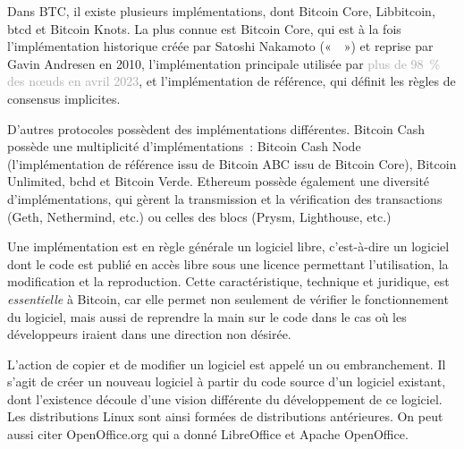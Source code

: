Dans BTC, il existe plusieurs implémentations, dont Bitcoin Core, Libbitcoin, btcd et Bitcoin Knots. La plus connue est Bitcoin Core, qui est à la fois l'implémentation historique créée par Satoshi Nakamoto («~~») et reprise par Gavin Andresen en 2010, l'implémentation principale utilisée par \textcolor{darkgray}{plus de 98~\% des nœuds en avril 2023}, et l'implémentation de référence, qui définit les règles de consensus implicites.

D'autres protocoles possèdent des implémentations différentes. Bitcoin Cash possède une multiplicité d'implémentations~: Bitcoin Cash Node (l'implémentation de référence issu de Bitcoin ABC issu de Bitcoin Core), Bitcoin Unlimited, bchd et Bitcoin Verde. Ethereum possède également une diversité d'implémentations, qui gèrent la transmission et la vérification des transactions (Geth, Nethermind, etc.) ou celles des blocs (Prysm, Lighthouse, etc.)

Une implémentation est en règle générale un logiciel libre, c'est-à-dire un logiciel dont le code est publié en accès libre sous une licence permettant l'utilisation, la modification et la reproduction. Cette caractéristique, technique et juridique, est \emph{essentielle} à Bitcoin, car elle permet non seulement de vérifier le fonctionnement du logiciel, mais aussi de reprendre la main sur le code dans le cas où les développeurs iraient dans une direction non désirée.

L'action de copier et de modifier un logiciel est appelé un  ou embranchement. Il s'agit de créer un nouveau logiciel à partir du code source d'un logiciel existant, dont l'existence découle d'une vision différente du développement de ce logiciel. Les distributions Linux sont ainsi formées de distributions antérieures. On peut aussi citer OpenOffice.org qui a donné LibreOffice et Apache OpenOffice.

